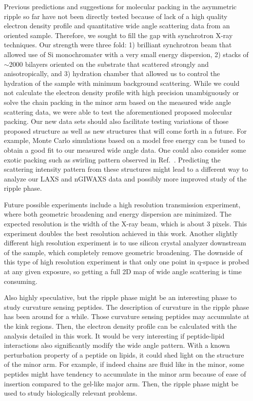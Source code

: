 Previous predictions and suggestions for molecular packing in the asymmetric
ripple so far have not been directly tested 
because of lack of a high quality electron
density profile and quantitative wide angle 
scattering data from an oriented sample.
Therefore, we sought to fill the gap
with synchrotron X-ray techniques. Our strength were three fold: 1) brilliant
synchrotron beam that allowed use of Si monochromater with a very small
energy dispersion, 2) stacks of $\sim$2000 bilayers oriented on the substrate
that scattered strongly and anisotropically, and 3) hydration chamber that 
allowed us to control the hydration of the sample with minimum background scattering.
While we could not calculate the electron density profile with high precision unambiguously
or solve the chain packing in the minor arm based on the measured wide angle scattering data, 
we were able to test the aforementioned proposed molecular packing.
Our new data sets should also facilitate testing variations of those proposed 
structure as well as new structures that will come forth in a future.
For example, Monte Carlo simulations based on a model free energy can be tuned
to obtain a good fit to our measured wide angle data.
One could also consider some exotic packing such as swirling pattern observed
in Ref.~\cite{ref:Watkins11}. Predicting the scattering
intensity pattern from these structures might lead to a different way
to analyze our LAXS and nGIWAXS data and possibly more improved study of the 
ripple phase. 

Future possible experiments
include a high resolution transmission experiment, where both geometric 
broadening and energy dispersion are minimized. The expected resolution 
is the width of the X-ray beam, which is about 3 pixels. This experiment 
doubles the best resolution achieved in this work. 
Another slightly different high resolution experiment is to use silicon 
crystal analyzer downstream of the sample, which completely remove geometric
broadening. The downside of this type of high resolution experiment is that
only one point in q-space is probed at any given exposure, so getting a full
2D map of wide angle scattering is time consuming.  

Also highly speculative, but the ripple phase might be an interesting phase
to study curvature sensing peptides. The description of curvature in the
ripple phase has been around for a while. Those curvature sensing peptides
may accumulate at the kink regions. Then, the electron density profile
can be calculated with the analysis detailed in this work. It would 
be very interesting if peptide-lipid interactions also significantly 
modify the wide angle pattern. With a known perturbation property of 
a peptide on lipids, it could shed light on the structure of the minor arm.
For example, if indeed chains are fluid like in the minor, some peptides
might have tendency to accumulate in the minor arm because of ease of 
insertion compared to the gel-like major arm.
Then, the ripple phase might be used to study biologically relevant problems.
